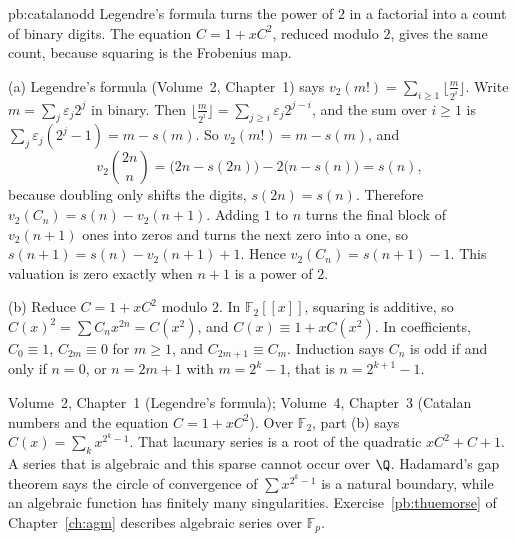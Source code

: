 \begin{solution}{pb:catalanodd}
\idea Legendre's formula turns the power of $2$ in a factorial into a count of binary digits. The equation $C=1+xC^2$, reduced modulo $2$, gives the same count, because squaring is the Frobenius map.

\writeup (a) Legendre's formula (Volume~2, Chapter~1) says $v_2(m!)=\sum_{i\ge1}\lfloor\frac m{2^i}\rfloor$. Write $m=\sum_j\varepsilon_j2^j$ in binary. Then
$\lfloor\frac m{2^i}\rfloor=\sum_{j\ge i}\varepsilon_j2^{j-i}$, and the sum over $i\ge1$ is $\sum_j\varepsilon_j(2^j-1)=m-s(m)$. So $v_2(m!)=m-s(m)$, and
\[
v_2\binom{2n}n=\bigl(2n-s(2n)\bigr)-2\bigl(n-s(n)\bigr)=s(n),
\]
because doubling only shifts the digits, $s(2n)=s(n)$. Therefore $v_2(C_n)=s(n)-v_2(n+1)$. Adding $1$ to $n$ turns the final block of
$v_2(n+1)$ ones into zeros and turns the next zero into a one, so $s(n+1)=s(n)-v_2(n+1)+1$. Hence $v_2(C_n)=s(n+1)-1$. This valuation is zero
exactly when $n+1$ is a power of $2$.

(b) Reduce $C=1+xC^2$ modulo $2$. In $\mathbb F_2[[x]]$, squaring is additive, so $C(x)^2=\sum C_nx^{2n}=C(x^2)$, and
$C(x)\equiv1+xC(x^2)$. In coefficients, $C_0\equiv1$, $C_{2m}\equiv0$ for $m\ge1$, and $C_{2m+1}\equiv C_m$. Induction says $C_n$ is odd if
and only if $n=0$, or $n=2m+1$ with $m=2^k-1$, that is $n=2^{k+1}-1$.

\tools Volume~2, Chapter~1 (Legendre's formula); Volume~4, Chapter~3 (Catalan numbers and the equation $C=1+xC^2$).
\leads Over $\mathbb F_2$, part (b) says $C(x)=\sum_kx^{2^k-1}$. That lacunary series is a root of the quadratic $xC^2+C+1$. A series that is
algebraic and this sparse cannot occur over $\Q$. Hadamard's gap theorem says the circle of convergence of $\sum x^{2^k-1}$ is a
natural boundary, while an algebraic function has finitely many singularities. Exercise~\ref{pb:thuemorse} of Chapter~\ref{ch:agm} describes
algebraic series over $\mathbb F_p$.
\end{solution}

